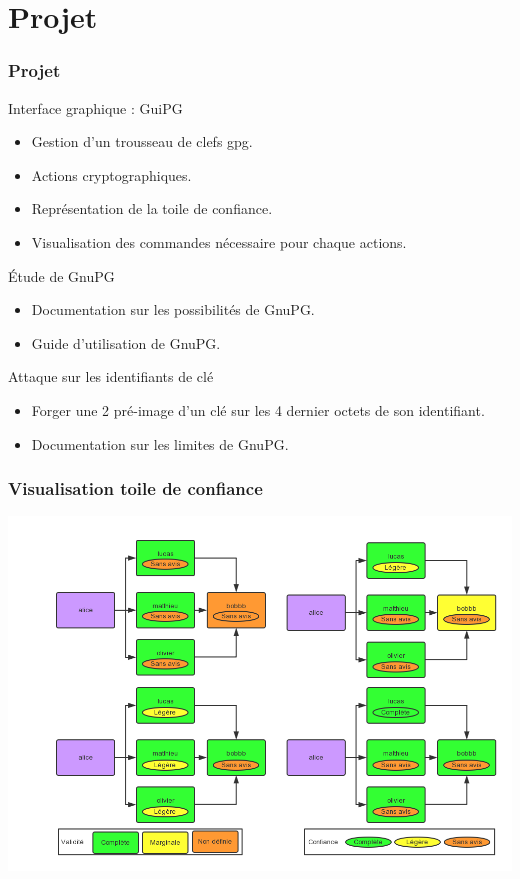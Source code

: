 \section{Projet}
\begin{frame}
    \frametitle{\color{white}Projet}
    \begin{block}{Interface graphique : GuiPG}
      \begin{itemize}
        \item Gestion d'un trousseau de clefs gpg.
        \item Actions cryptographiques.
        \item Représentation de la toile de confiance.
        \item Visualisation des commandes nécessaire pour chaque actions.
      \end{itemize}
    \end{block}
\pause
    \begin{block}{Étude de GnuPG}
    \begin{itemize}
      \item Documentation sur les possibilités de GnuPG.
      \item Guide d'utilisation de GnuPG.
    \end{itemize}
    \pause
    \end{block}
    \begin{block}{Attaque sur les identifiants de clé}
      \begin{itemize}
        \item Forger une 2 pré-image d'un clé sur les 4 dernier octets de son identifiant.
        \item Documentation sur les limites de GnuPG.
      \end{itemize}
    \end{block}
\end{frame}

\begin{frame}
  \frametitle{\color{white}Visualisation toile de confiance}
    \includegraphics[scale=0.3]{tdcdemo.png}
\end{frame}

